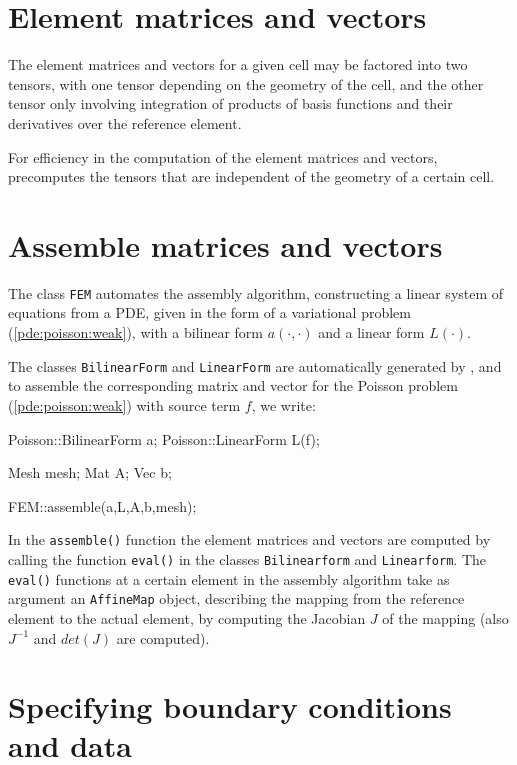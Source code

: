 \section{Element matrices and vectors} 

The element matrices and vectors for a given cell may be factored 
into two tensors, with one tensor depending on the geometry of the cell, 
and the other tensor only involving integration of products of 
basis functions and their derivatives over the reference element.  

For efficiency in the computation of the element matrices 
and vectors, \ffc{} precomputes the tensors that are independent of 
the geometry of a certain cell. 

\section{Assemble matrices and vectors}

The class \texttt{FEM} automates the assembly algorithm, constructing a linear 
system of equations from a PDE, 
given in the form of a variational problem (\ref{pde:poisson:weak}), 
with a bilinear form $a(\cdot,\cdot)$ and a linear form $L(\cdot)$. 

The classes \texttt{BilinearForm} and \texttt{LinearForm} are automatically 
generated by \ffc{}, and to assemble the corresponding matrix and vector for 
the Poisson problem (\ref{pde:poisson:weak}) with source term $f$, we write:  
\begin{code}
Poisson::BilinearForm a;
Poisson::LinearForm L(f);

Mesh mesh; 
Mat A;
Vec b;

FEM::assemble(a,L,A,b,mesh);
\end{code}

In the \texttt{assemble()} function the element matrices and vectors are 
computed by calling the function \texttt{eval()} in the classes 
\texttt{Bilinearform} and \texttt{Linearform}. 
The \texttt{eval()} functions at a certain element in the assembly algorithm 
take as argument an \texttt{AffineMap} object, 
describing the mapping from the reference element to the actual element, 
by computing the Jacobian $J$ of the mapping (also $J^{-1}$ and $det(J)$ 
are computed).  

\section{Specifying boundary conditions and data}

